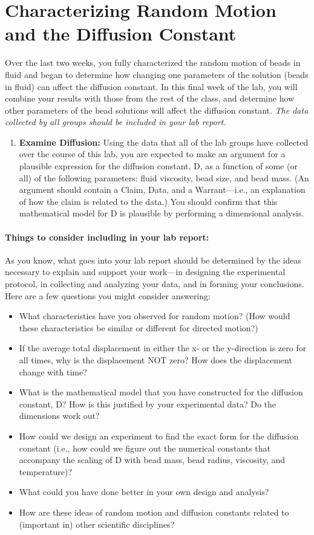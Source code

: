 \section{Characterizing Random Motion and the Diffusion Constant}
Over the last two weeks, you fully characterized the random motion of beads in fluid and began to determine how changing one parameters of the solution (beads in fluid) can affect the diffusion constant.
In this final week of the lab, you will combine your results with those from the rest of the class, and determine how other parameters of the bead solutions will affect the diffusion constant.
\emph{The data collected by all groups should be included in your lab report.}

\begin{enumerate}
\item \textbf{Examine Diffusion:} Using the data that all of the lab groups have collected over the course of this lab, you are expected to make an argument for a plausible expression for the diffusion constant, D, as a function of some (or all) of the following parameters: fluid viscosity, bead size, and bead mass. (An argument should contain a Claim, Data, and a Warrant—i.e., an explanation of how the claim is related to the data.) You should confirm that this mathematical model for D is plausible by performing a dimensional analysis.
\end{enumerate}

\paragraph*{Things to consider including in your lab report:} As you know, what goes into your lab report should be determined by the ideas necessary to explain and support your work—in designing the experimental protocol, in collecting and analyzing your data, and in forming your conclusions. Here are a few questions you might consider answering:
\begin{itemize}
\item What characteristics have you observed for random motion? (How would these characteristics be similar or different for directed motion?)
\item If the average total displacement in either the x- or the y-direction is zero for all times, why is the displacement NOT zero? How does the displacement change with time?
\item What is the mathematical model that you have constructed for the diffusion constant, D? How is this justified by your experimental data? Do the dimensions work out?
\item How could we design an experiment to find the exact form for the diffusion constant (i.e., how could we figure out the numerical constants that accompany the scaling of D with bead mass, bead radius, viscosity, and temperature)?
\item What could you have done better in your own design and analysis?
\item How are these ideas of random motion and diffusion constants related to (important in) other scientific disciplines?
\end{itemize}

